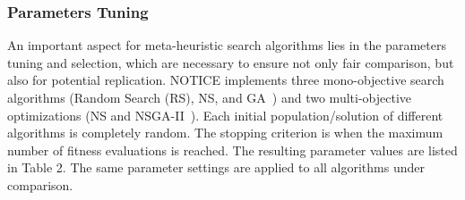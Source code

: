 \subsubsection{Parameters Tuning}
An important aspect for meta-heuristic search algorithms lies in the parameters tuning and selection, which are necessary to ensure not only fair comparison, but also for potential replication.
NOTICE implements three mono-objective search algorithms (Random Search (RS), NS, and GA~\cite{cooper2002adaptive}) and two multi-objective optimizations (NS and NSGA-II~\cite{deb2002fast}). Each initial population/solution of different algorithms is completely random. The stopping criterion is when the maximum number of fitness evaluations is reached.
The resulting parameter values are listed in Table 2. The same parameter settings are applied to all algorithms under comparison.

